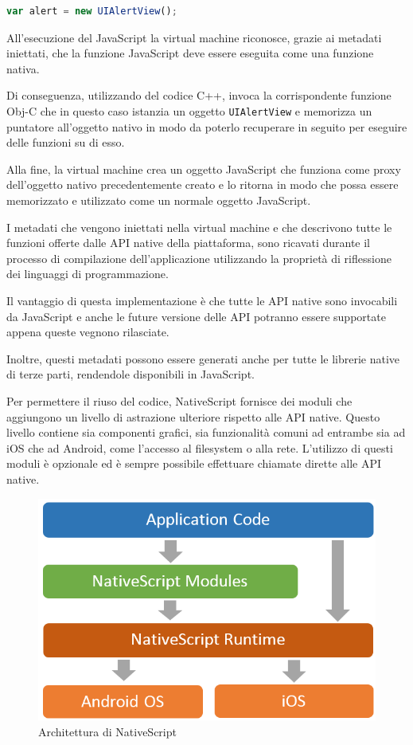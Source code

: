 \begin{lstlisting}[language=JavaScript, caption=Esempio di creazione di un oggetto nativo con NativeScript]
var alert = new UIAlertView();
\end{lstlisting}

All'esecuzione del JavaScript la virtual machine riconosce, grazie ai metadati iniettati, che la funzione JavaScript deve essere eseguita come una funzione nativa.

Di conseguenza, utilizzando del codice C++, invoca la corrispondente funzione Obj-C che in questo caso istanzia un oggetto \texttt{UIAlertView} e memorizza un puntatore all'oggetto nativo in modo da poterlo recuperare in seguito per eseguire delle funzioni su di esso.

Alla fine, la virtual machine crea un oggetto JavaScript che funziona come proxy dell'oggetto nativo precedentemente creato e lo ritorna in modo che possa essere memorizzato e utilizzato come un normale oggetto JavaScript.

I metadati che vengono iniettati nella virtual machine e che descrivono tutte le funzioni offerte dalle API native della piattaforma, sono ricavati durante il processo di compilazione dell'applicazione utilizzando la proprietà di \gls{riflessione} dei linguaggi di programmazione.

Il vantaggio di questa implementazione è che tutte le API native sono invocabili da JavaScript e anche le future versione delle API potranno essere supportate appena queste vegnono rilasciate.

Inoltre, questi metadati possono essere generati anche per tutte le librerie native di terze parti, rendendole disponibili in JavaScript.

Per permettere il riuso del codice, NativeScript fornisce dei moduli che aggiungono un livello di astrazione ulteriore rispetto alle API native.
Questo livello contiene sia componenti grafici, sia funzionalità comuni ad entrambe sia ad iOS che ad Android, come l'accesso al filesystem o alla rete.
L'utilizzo di questi moduli è opzionale ed è sempre possibile effettuare chiamate dirette alle API native.

\begin{figure}[htp]
\centering
\includegraphics[width=\textwidth/2]{../immagini/ns-architecture}
\caption{Architettura di NativeScript}  
\end{figure}
\FloatBarrier

